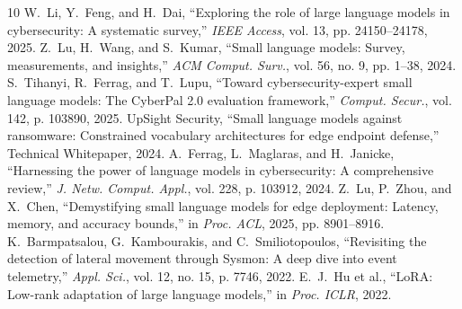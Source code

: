 \documentclass[10pt,journal,compsoc]{IEEEtran}
\begin{document}
\begin{thebibliography}{10}
 W.~Li, Y.~Feng, and H.~Dai, ``Exploring the role of large language models in cybersecurity: A systematic survey,'' \emph{IEEE Access}, vol. 13, pp. 24150--24178, 2025.
 Z.~Lu, H.~Wang, and S.~Kumar, ``Small language models: Survey, measurements, and insights,'' \emph{ACM Comput. Surv.}, vol. 56, no. 9, pp. 1--38, 2024.
 S.~Tihanyi, R.~Ferrag, and T.~Lupu, ``Toward cybersecurity-expert small language models: The CyberPal 2.0 evaluation framework,'' \emph{Comput. Secur.}, vol. 142, p. 103890, 2025.
 UpSight Security, ``Small language models against ransomware: Constrained vocabulary architectures for edge endpoint defense,'' Technical Whitepaper, 2024.
 A.~Ferrag, L.~Maglaras, and H.~Janicke, ``Harnessing the power of language models in cybersecurity: A comprehensive review,'' \emph{J. Netw. Comput. Appl.}, vol. 228, p. 103912, 2024.
 Z.~Lu, P.~Zhou, and X.~Chen, ``Demystifying small language models for edge deployment: Latency, memory, and accuracy bounds,'' in \emph{Proc. ACL}, 2025, pp. 8901--8916.
 K.~Barmpatsalou, G.~Kambourakis, and C.~Smiliotopoulos, ``Revisiting the detection of lateral movement through Sysmon: A deep dive into event telemetry,'' \emph{Appl. Sci.}, vol. 12, no. 15, p. 7746, 2022.
 E.~J.~Hu et al., ``LoRA: Low-rank adaptation of large language models,'' in \emph{Proc. ICLR}, 2022.
\end{thebibliography}
\end{document}
